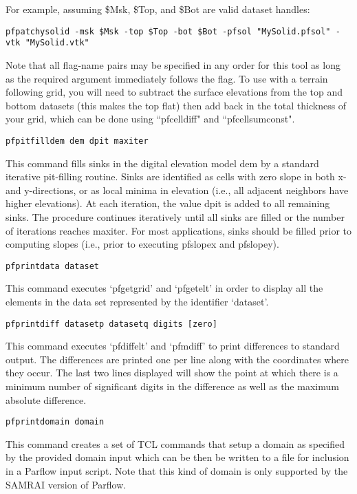 \begin{description}
For example, assuming \$Msk, \$Top, and \$Bot are valid dataset handles:
\begin{display}
\begin{verbatim}
pfpatchysolid -msk $Msk -top $Top -bot $Bot -pfsol "MySolid.pfsol" -vtk "MySolid.vtk"
\end{verbatim}
\end{display}
Note that all flag-name pairs may be specified in any order for this tool as long as the required argument immediately follows the flag. To use with a terrain following grid, you will need to subtract the surface elevations from the top and bottom datasets (this makes the top flat) then add back in the total thickness of your grid, which can be done using ``pfcelldiff" and ``pfcellsumconst".


\item{\begin{verbatim}pfpitfilldem dem dpit maxiter \end{verbatim}}
This command fills sinks in the digital elevation model dem by a standard iterative
pit-filling routine. Sinks are identified as cells with zero slope in both x- and
y-directions, or as local minima in elevation (i.e., all adjacent neighbors have
higher elevations). At each iteration, the value dpit is added to all remaining
sinks. The procedure continues iteratively until all sinks are filled or the number
of iterations reaches maxiter. For most applications, sinks should be filled prior
to computing slopes (i.e., prior to executing pfslopex and pfslopey).


\item{\begin{verbatim}pfprintdata dataset\end{verbatim}}
This command executes `pfgetgrid' and `pfgetelt' in order to display
all the elements in the data set represented by the identifier
`dataset'.


\item{\begin{verbatim}pfprintdiff datasetp datasetq digits [zero]\end{verbatim}}
This command executes `pfdiffelt' and `pfmdiff' to print differences
to standard output.  The differences are printed one per line along
with the coordinates where they occur.  The last two lines displayed
will show the point at which there is a minimum number of significant
digits in the difference as well as the maximum absolute difference.


\item{\begin{verbatim}pfprintdomain domain\end{verbatim}} This command
 creates a set of TCL commands that setup a domain as specified by the
 provided domain input which can be then be written to a file for
 inclusion in a Parflow input script.  Note that this kind of domain
 is only supported by the SAMRAI version of Parflow.


\end{description}
